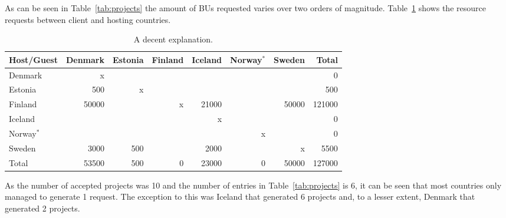 As can be seen in Table~\ref{tab:projects} the amount of BUs requested varies over two orders of magnitude.
Table~\ref{tab:results} shows the resource requests between client and hosting countries.
\begin{table}[ht]
\begin{center}
\begin{tabular}{|l|r|r|r|r|r|r|r|} \hline
\bf Host/Guest &Denmark &Estonia &Finland &Iceland &Norway$^*$ &Sweden &Total \\\hline
Denmark & x & & & & & & 0 \\
Estonia & 500 & x & & & & & 500 \\
Finland & 50000 & & x & 21000 & & 50000 & 121000 \\
Iceland & & & & x & & & 0 \\
Norway$^*$  & & & & & x & & 0 \\
Sweden  & 3000 & 500 & & 2000 & & x & 5500 \\
\hline
Total & 53500 & 500 & 0 & 23000 & 0 & 50000 & 127000 \\ \hline
\end{tabular}
\caption{A decent explanation. \label{tab:results}}
\end{center}
\end{table}

As the number of accepted projects was 10 and the number of entries in Table~\ref{tab:projects} is 6, it can be seen that most countries only managed to generate 1 request.
The exception to this was Iceland that generated 6 projects and, to a lesser extent, Denmark that generated 2 projects.
